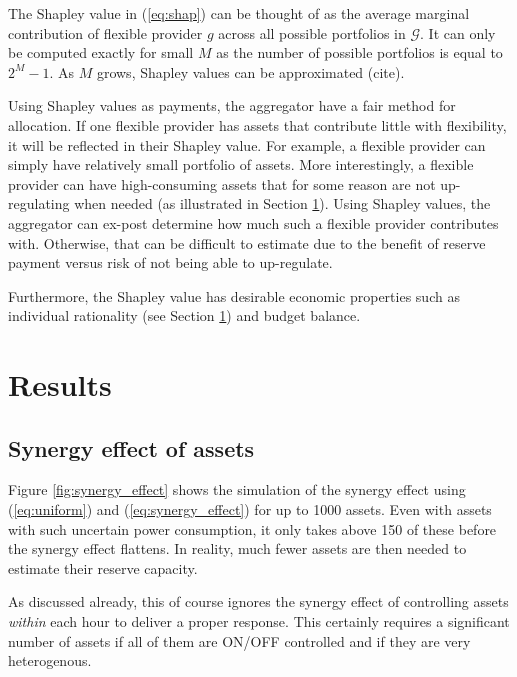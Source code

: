 \documentclass[lettersize,journal]{IEEEtran}
\begin{document}
The Shapley value  in (\ref{eq:shap}) can be thought of as the average marginal contribution of flexible provider $g$ across all possible portfolios in $\mathcal{G}$. It can only be computed exactly for small $M$ as the number of possible portfolios is equal to $2^{M} - 1$. As $M$ grows, Shapley values can be approximated (cite).

Using Shapley values as payments, the aggregator have a fair method for allocation. If one flexible provider has assets that contribute little with flexibility, it will be reflected in their Shapley value. For example, a flexible provider can simply have relatively small portfolio of assets. More interestingly, a flexible provider can have high-consuming assets that for some reason are not up-regulating when needed (as illustrated in Section \ref{sec:Results}). Using Shapley values, the aggregator can ex-post determine how much such a flexible provider contributes with. Otherwise, that can be difficult to estimate due to the benefit of reserve payment versus risk of not being able to up-regulate.

Furthermore, the Shapley value has desirable economic properties such as individual rationality (see Section \ref{sec:Results}) and budget balance.

\section{Results}\label{sec:Results}

\subsection{Synergy effect of assets}

Figure \ref{fig:synergy_effect} shows the simulation of the synergy effect using (\ref{eq:uniform}) and (\ref{eq:synergy_effect}) for up to 1000 assets. Even with assets with such uncertain power consumption, it only takes above 150 of these before the synergy effect flattens. In reality, much fewer assets are then needed to estimate their reserve capacity.

As discussed already, this of course ignores the synergy effect of controlling assets \textit{within} each hour to deliver a proper response. This certainly requires a significant number of assets if all of them are ON/OFF controlled and if they are very heterogenous.
\end{document}
